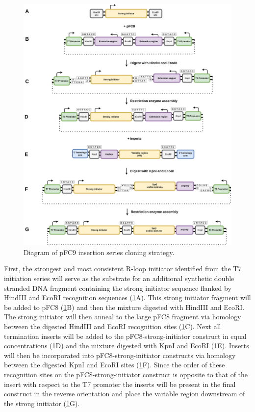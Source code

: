 \documentclass[11pt]{article}
\begin{document}
\begin{figure}[H]
	\includegraphics[width=15cm]{images/cloning_diagrams/construct_diagrams-T7-termination-series.png}
	\centering
	\caption{Diagram of pFC9 insertion series cloning strategy.}
	\label{clone:T7-term}
	
\end{figure}

 First, the strongest and most consistent R-loop initiator identified from the T7 initiation series will serve as the substrate for an additional synthetic double stranded DNA fragment containing the strong initiator sequence flanked by  HindIII and EcoRI recognition sequences (\ref{clone:T7-term}A). This strong initiator fragment will be added to pFC8  (\ref{clone:T7-term}B) and then the mixture digested with HindIII and EcoRI. The strong initiator will then anneal to the large pFC8 fragment via homology between the digested HindIII and EcoRI recognition sites (\ref{clone:T7-term}C). Next all termination inserts will be added to the pFC8-strong-initiator construct in equal concentrations (\ref{clone:T7-term}D) and the mixture digested with KpnI and EcoRI (\ref{clone:T7-term}E). Inserts will then be incorporated into pFC8-strong-initiator constructs via homology between the digested KpnI and EcoRI sites (\ref{clone:T7-term}F). Since the order of these recognition sites on the pFC8-strong-initiator construct is opposite to that of the insert with respect to the T7 promoter the inserts will be present in the final construct in the reverse orientation and place the variable region downstream of the strong initiator (\ref{clone:T7-term}G). 
 
\end{document}
